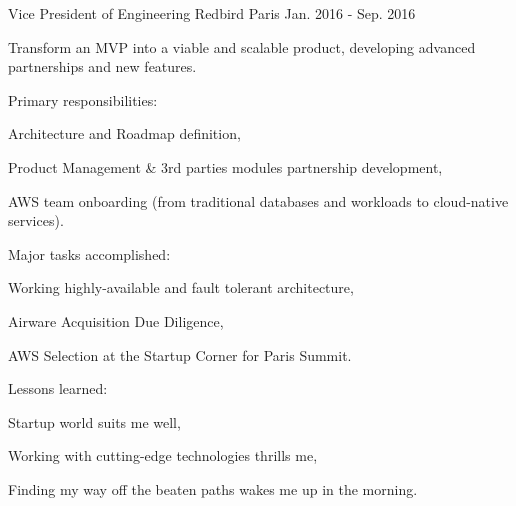 \begin{cventries}
  \cventry
    {Vice President of Engineering} %
    {Redbird} %
    {Paris} %
    {Jan. 2016 - Sep. 2016} %
    {
      \begin{cvitems} %
        \item {Transform an MVP into a viable and scalable product, developing advanced partnerships and new features.}
        \item {Primary responsibilities:} %
        \begin{cvsubitems}
          \item {Architecture and Roadmap definition,}
          \item {Product Management \& 3rd parties modules partnership development,}
          \item {AWS team onboarding (from traditional databases and workloads to cloud-native services).}
        \end{cvsubitems}
        \item {Major tasks accomplished:}
        \begin{cvsubitems}
          \item {Working highly-available and fault tolerant architecture,}
          \item {Airware Acquisition Due Diligence,}
          \item {AWS Selection at the Startup Corner for Paris Summit.}
        \end{cvsubitems}
        \item {Lessons learned:}
        \begin{cvsubitems}
          \item {Startup world suits me well,}
          \item {Working with cutting-edge technologies thrills me,}
          \item {Finding my way off the beaten paths wakes me up in the morning.}
        \end{cvsubitems}
      \end{cvitems}
    }


\end{cventries}
